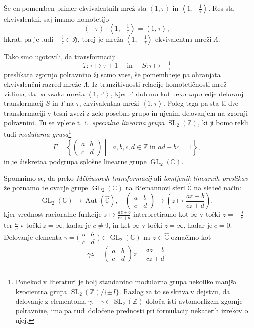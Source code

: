 \documentclass[mat1]{fmfdelo}
\numberwithin{equation}{section}
\newcommand{\Z}{\mathbb Z}
\newcommand{\C}{\mathbb C}
\newcommand{\HH}{\mathfrak{H}}
\newcommand{\RS}{\widehat{\C}}
\newcommand{\SL}{\Gamma}
\newcommand{\abcd}{\big(\begin{smallmatrix} a & b\\c & d \end{smallmatrix}\big)}
\newcommand{\pabcd}{\begin{pmatrix} a & b \\ c & d \end{pmatrix}}
\newcommand{\lattice}[2]{\left\langle #1, #2 \right\rangle}
\newcommand{\ti}{t.~i.\ }
\DeclareMathOperator{\GL}{GL}
\DeclareMathOperator{\Aut}{Aut}
\theoremstyle{definition}
\begin{document}
Še en pomemben primer ekvivalentnih mrež sta $\lattice{1}{\tau}$ in $\lattice{1}{-\frac{1}{\tau}}$. Res sta ekvivalentni, saj imamo homotetijo
\[
    (-\tau)\cdot\lattice{1}{-\tfrac1\tau} = \lattice{1}{\tau},
\] 
hkrati pa je tudi $-\frac{1}{\tau} \in \HH$, torej je mreža $\lattice{1}{-\tfrac{1}{\tau}}$ ekvivalentna mreži $\Lambda$.

Tako smo ugotovili, da transformaciji
\[
    T:\tau \mapsto \tau + 1 \quad \text{ in } \quad S:\tau \mapsto -\tfrac1\tau
\]
preslikata zgornjo polravnino $\HH$ samo vase, še pomembneje pa ohranjata ekvivalenčni razred mreže $\Lambda$. Iz tranzitivnosti relacije homotetičnosti mrež vidimo, da bo vsaka mreža $\lattice{1}{\tau'}$, kjer $\tau'$ dobimo kot neko zaporedje delovanj transformacij $S$ in $T$ na $\tau$, ekvivalentna mreži $\lattice{1}{\tau}$.
Poleg tega pa sta ti dve transformaciji v tesni zvezi z zelo posebno grupo in njenim delovanjem na zgornji polravnini.
Tu se vplete \ti \emph{specialna linearna grupa} $\operatorname{SL}_2(\Z)$, ki ji bomo rekli tudi \emph{modularna grupa}\footnote{Ponekod v literaturi je bolj standardno modularna grupa nekoliko manjša kvocientna grupa $\operatorname{SL}_2(\Z)/\{\pm I\}$. Razlog za to se skriva v dejstvu, da delovanje z elementoma $\gamma, -\gamma \in \operatorname{SL}_2(\Z)$ določa isti avtomorfizem zgornje polravnine, ima pa  tudi določene prednosti pri formulaciji nekaterih izrekov o njej. 
}
\[
    \SL = \left\{\pabcd \middle\vert \text{ } a,b,c,d \in \Z \text{ in } ad - bc = 1\right\},
\]
in je diskretna podgrupa splošne linearne grupe $\GL_2(\C)$. 

Spomnimo se, da preko \emph{Möbiusovih transformacij} ali \emph{lomljenih linearnih preslikav} že poznamo delovanje grupe $\GL_2(\C)$ na Riemannovi sferi $\RS$ na sledeč način:
\begin{equation}
    \label{eq: delovanje GL2C na CP1}
    \GL_2(\C) \to \Aut(\RS), \quad \pabcd \mapsto \left(z \mapsto \frac{az + b}{cz + d}\right),
\end{equation}
kjer vrednost racionalne funkcije $z\mapsto\frac{az + b}{cz + d}$ interpretiramo kot $\infty$ v točki $z = -\frac{d}{c}$ ter $\frac{a}{c}$ v točki $z = \infty$, kadar je $c \neq 0$, in kot $\infty$ v točki $z = \infty$, kadar je $c = 0$. Delovanje elementa $\gamma = \abcd \in \GL_2(\C)$ na $z \in \RS$ označimo kot
\begin{equation}
    \label{eq: predpis delovanja GL2C}
    \gamma z =  \pabcd z = \frac{az + b}{cz + d}.
\end{equation}
\end{document}
